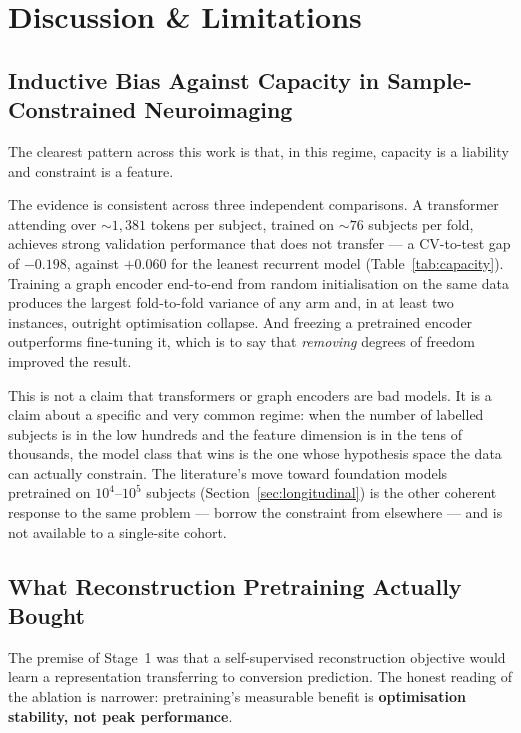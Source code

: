 \chapter{Discussion \& Limitations}
\label{ch:discussion}

\section{Inductive Bias Against Capacity in Sample-Constrained Neuroimaging}
\label{sec:disc-capacity}

The clearest pattern across this work is that, in this regime, capacity is a liability and
constraint is a feature.

The evidence is consistent across three independent comparisons. A transformer attending
over ${\sim}1{,}381$ tokens per subject, trained on ${\sim}76$ subjects per fold, achieves
strong validation performance that does not transfer --- a CV-to-test gap of $-0.198$,
against $+0.060$ for the leanest recurrent model (Table~\ref{tab:capacity}). Training a
graph encoder end-to-end from random initialisation on the same data produces the largest
fold-to-fold variance of any arm and, in at least two instances, outright optimisation
collapse. And freezing a pretrained encoder outperforms fine-tuning it, which is to say that
\emph{removing} degrees of freedom improved the result.

This is not a claim that transformers or graph encoders are bad models. It is a claim about
a specific and very common regime: when the number of labelled subjects is in the low
hundreds and the feature dimension is in the tens of thousands, the model class that wins is
the one whose hypothesis space the data can actually constrain. The literature's move toward
foundation models pretrained on $10^4$--$10^5$ subjects (Section~\ref{sec:longitudinal}) is
the other coherent response to the same problem --- borrow the constraint from elsewhere ---
and is not available to a single-site cohort.

\section{What Reconstruction Pretraining Actually Bought}
\label{sec:disc-pretraining}

The premise of Stage~1 was that a self-supervised reconstruction objective would learn a
representation transferring to conversion prediction. The honest reading of the ablation is
narrower: pretraining's measurable benefit is \textbf{optimisation stability, not peak
performance}.

